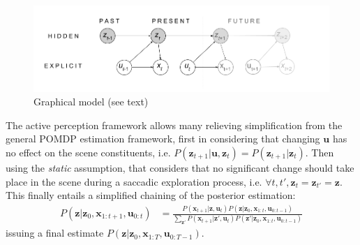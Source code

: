 \documentclass{article} %
\begin{document}
\begin{figure}[t!]
	\centerline{
		\includegraphics[width = \linewidth]{img/ICLR-graphical-v2.png} 
	}
	\caption{Graphical model (see text)}\label{fig:graphical}
\end{figure}


The active perception framework allows many relieving simplification from the general POMDP estimation framework, first in considering that changing $\boldsymbol{u}$ has no effect on the scene constituents, i.e. $P(\boldsymbol{z}_{t+1}|\boldsymbol{u},\boldsymbol{z}_t) = P(\boldsymbol{z}_{t+1}|\boldsymbol{z}_t)$. Then using the \emph{static} assumption, that considers that no significant change should take place in the scene during a saccadic exploration process, i.e. $\forall t, t', \boldsymbol{z}_{t} = \boldsymbol{z}_{t'} = \boldsymbol{z}$. This finally entails a simplified chaining of the posterior estimation:
 	\begin{align}
 	P(\boldsymbol{z}|\boldsymbol{z}_0,\boldsymbol{x}_{1:t+1},\boldsymbol{u}_{0:t}) &= \frac{P(\boldsymbol{x}_{t+1}|\boldsymbol{z},\boldsymbol{u}_t) P(\boldsymbol{z}|\boldsymbol{z}_0,\boldsymbol{x}_{1:t}, \boldsymbol{u}_{0:t-1})}{\sum_{\boldsymbol{z}'}P(\boldsymbol{x}_{t+1}|\boldsymbol{z}',\boldsymbol{u}_t) P(\boldsymbol{z}'|\boldsymbol{z}_0,\boldsymbol{x}_{1:t}, \boldsymbol{u}_{0:t-1})}
 	\end{align}
issuing a final estimate $P(\boldsymbol{z}|\boldsymbol{z}_0, \boldsymbol{x}_{1:T}, \boldsymbol{u}_{0:T-1})$.  
\end{document}

